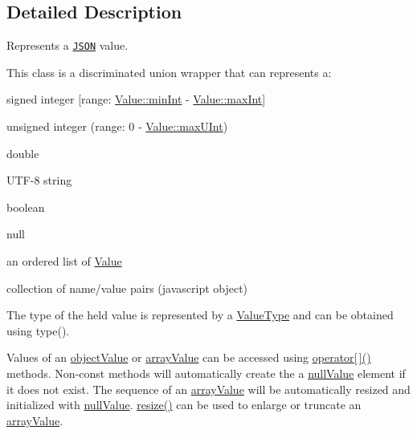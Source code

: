 \subsection{Detailed Description}
Represents a \href{http://www.json.org}{\tt J\+S\+O\+N} value. 

This class is a discriminated union wrapper that can represents a\+:
\begin{DoxyItemize}
\item signed integer \mbox{[}range\+: \hyperlink{class_json_1_1_value_a7df8a39e2502b8c92a6a41e3d752d2c8}{Value\+::min\+Int} -\/ \hyperlink{class_json_1_1_value_a978c799a8af3114ef7dab6fd0a310a1b}{Value\+::max\+Int}\mbox{]}
\item unsigned integer (range\+: 0 -\/ \hyperlink{class_json_1_1_value_ac79e63ee68d3aa914bfd6988be669b87}{Value\+::max\+U\+Int})
\item double
\item U\+T\+F-\/8 string
\item boolean
\item \textquotesingle{}null\textquotesingle{}
\item an ordered list of \hyperlink{class_json_1_1_value}{Value}
\item collection of name/value pairs (javascript object)
\end{DoxyItemize}

The type of the held value is represented by a \hyperlink{namespace_json_a7d654b75c16a57007925868e38212b4e}{Value\+Type} and can be obtained using type().

Values of an \hyperlink{namespace_json_a7d654b75c16a57007925868e38212b4eae8386dcfc36d1ae897745f7b4f77a1f6}{object\+Value} or \hyperlink{namespace_json_a7d654b75c16a57007925868e38212b4eadc8f264f36b55b063c78126b335415f4}{array\+Value} can be accessed using \hyperlink{class_json_1_1_value_a7d99f5dba388cdaa152ce6ef933d64ef}{operator\mbox{[}$\,$\mbox{]}()} methods. Non-\/const methods will automatically create the a \hyperlink{namespace_json_a7d654b75c16a57007925868e38212b4ea7d9899633b4409bd3fc107e6737f8391}{null\+Value} element if it does not exist. The sequence of an \hyperlink{namespace_json_a7d654b75c16a57007925868e38212b4eadc8f264f36b55b063c78126b335415f4}{array\+Value} will be automatically resized and initialized with \hyperlink{namespace_json_a7d654b75c16a57007925868e38212b4ea7d9899633b4409bd3fc107e6737f8391}{null\+Value}. \hyperlink{class_json_1_1_value_aa284353271ada427dbfa04a42f2be407}{resize()} can be used to enlarge or truncate an \hyperlink{namespace_json_a7d654b75c16a57007925868e38212b4eadc8f264f36b55b063c78126b335415f4}{array\+Value}.

